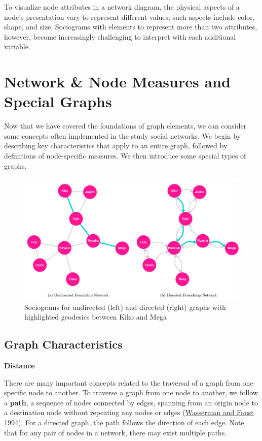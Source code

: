 \documentclass{book}
\begin{document}
To visualize node attributes in a network diagram, the physical aspects of a
node's presentation vary to represent different values; such aspects include
color, shape, and size. Sociograms with elements to represent more than two
attributes, however, become increasingly challenging to interpret with each
additional variable.

\hypertarget{network-node-measures-and-special-graphs}{%
\section{Network \& Node Measures and Special
Graphs}\label{network-node-measures-and-special-graphs}}

Now that we have covered the foundations of graph elements, we can consider
some concepts often implemented in the study social networks. We begin by
describing key characteristics that apply to an entire graph, followed by
definitions of node-specific measures. We then introduce some special types of
graphs.

\begin{figure}
\centering
\includegraphics{images/social-networks/11-4.png}
\caption{Sociograms for undirected (left) and directed (right) graphs with
highlighted geodesics between Kiko and Mega}
\end{figure}

\hypertarget{graph-characteristics}{%
\subsection{Graph Characteristics}\label{graph-characteristics}}

\textbf{Distance}

There are many important concepts related to the traversal of a graph from one
specific node to another. To traverse a graph from one node to another, we
follow a \textbf{path}, a sequence of nodes connected by edges, spanning from
an origin node to a destination node without repeating any nodes or edges
(\protect\hyperlink{ref-WassermanFaust1994}{Wasserman and Faust 1994}). For a
directed graph, the path follows the direction of each edge. Note that for any
pair of nodes in a network, there may exist multiple paths.
\end{document}
